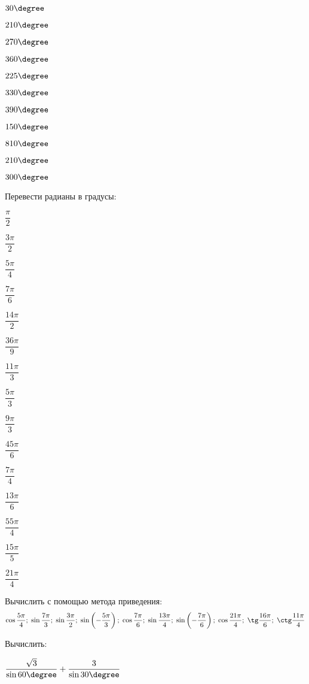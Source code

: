 \begin{class}[number=5]
\begin{listofex}
\begin{enumcols}[itemcolumns=5]
			\item \( 30\degree \)
			\item \( 210\degree \)
			\item \( 270\degree \)
			\item \( 360\degree \)
			\item \( 225\degree \)
			\item \( 330\degree \)
			\item \( 390\degree \)
			\item \( 150\degree \)
			\item \( 810\degree \)
			\item \( 210\degree \)
			\item \( 300\degree \)
		\end{enumcols}
		\item Перевести радианы в градусы:
		\begin{enumcols}[itemcolumns=5]
			\item \( \dfrac{\pi}{2} \)
			\item \( \dfrac{3\pi}{2} \)
			\item \( \dfrac{5\pi}{4} \)
			\item \( \dfrac{7\pi}{6} \)
			\item \( \dfrac{14\pi}{2} \)
			\item \( \dfrac{36\pi}{9} \)
			\item \( \dfrac{11\pi}{3} \)
			\item \( \dfrac{5\pi}{3} \)
			\item \( \dfrac{9\pi}{3} \)
			\item \( \dfrac{45\pi}{6} \)
			\item \( \dfrac{7\pi}{4} \)
			\item \( \dfrac{13\pi}{6} \)
			\item \( \dfrac{55\pi}{4} \)
			\item \( \dfrac{15\pi}{5} \)
			\item \( \dfrac{21\pi}{4} \)
		\end{enumcols}
		\item Вычислить с помощью метода приведения:
		\[ \cos\dfrac{5\pi}{4};\;\sin\dfrac{7\pi}{3};\;\sin\dfrac{3\pi}{2};\;\sin\left( -\dfrac{5\pi}{3} \right);\;\cos\dfrac{7\pi}{6};\;\sin\dfrac{13\pi}{4};\;\sin\left( -\dfrac{7\pi}{6}  \right);\;\cos\dfrac{21\pi}{4};\;\tg\dfrac{16\pi}{6};\;\ctg\dfrac{11\pi}{4} \]
		\item Вычислить:
		\begin{enumcols}[itemcolumns=2]
			\item \( \dfrac{\sqrt{3}}{\sin60\degree}+\dfrac{3}{\sin30\degree} \)

\end{enumcols}
\end{listofex}
\end{class}
